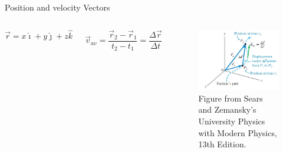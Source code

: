 \documentclass[]{beamer}
\begin{document}
\begin{frame}
    Position and velocity Vectors
    \vspace{3mm}
 
    \begin{columns}[c]
        \column{2in}  %
       
        \begin{equation}
          \vec{r}=x\hat{\imath}+y\hat{\jmath}+z\hat{k}
         \end{equation}
         \vspace{3mm}
      

        \begin{equation}
            \vec{v}_{av}=\frac{\vec{r}_2-\vec{r}_1}{t_2-t_1}=\frac{\Delta \vec{r}}{\Delta{t}}
        \end{equation}
     
        \vspace{3mm}
     
        
    
        \column{2.5in}
        
        \begin{figure}[h!]  
       \includegraphics[width=1.\textwidth]{images/8.jpg}
        \caption{ {\tiny Figure from Sears and Zemansky's University Physics 
        with Modern Physics, 13th Edition.} }
     \end{figure}
     
     
     
        \end{columns}
    
\end{frame}
\end{document}
